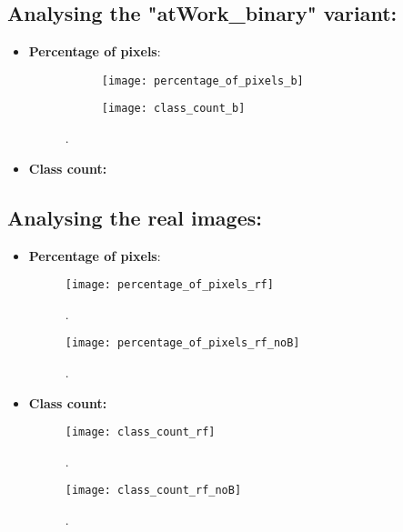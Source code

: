 \documentclass[paper=a4,11pt,parskip=half,toc=listof]{scrartcl}
\begin{document}
	\subsection{Analysing the "atWork\_binary" variant:}
	
		\begin{itemize}
			\item \textbf{Percentage of pixels}: 
			
			\begin{figure}[!htb]
				\centering
				\begin{subfigure}{.49\textwidth}
  					\centering
  					\texttt{[image: percentage\_of\_pixels\_b]}
  					\caption{}
  					\label{Fig:22a}
				\end{subfigure}%
				\begin{subfigure}{.49\textwidth}
  					\centering
  					\texttt{[image: class\_count\_b]}
  					\caption{}
  					\label{Fig:22b}
				\end{subfigure}%
			\caption{.}
			\label{Fig:22}
		\end{figure}
		
		\item \textbf{Class count:}
		\end{itemize}
		
		\subsection{Analysing the real images:}
	
		\begin{itemize}
			\item \textbf{Percentage of pixels}: 
			
			\begin{figure}[!htb]
			\centering
				\texttt{[image: percentage\_of\_pixels\_rf]}
				\caption{.}
				\label{Fig:18}
			\end{figure}
			
			\begin{figure}[!htb]
			\centering
				\texttt{[image: percentage\_of\_pixels\_rf\_noB]}
				\caption{.}
				\label{Fig:19}
			\end{figure}
			
			\item \textbf{Class count:} 
			
			\begin{figure}[!htb]
			\centering
				\texttt{[image: class\_count\_rf]}
				\caption{.}
				\label{Fig:20}
			\end{figure}
			
			\begin{figure}[!htb]
			\centering
				\texttt{[image: class\_count\_rf\_noB]}
				\caption{.}
				\label{Fig:21}
			\end{figure}
		\end{itemize}
\end{document}
